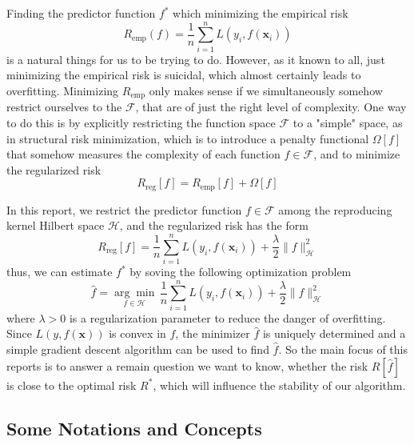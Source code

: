 Finding the predictor function $f^{*}$ which minimizing the empirical risk
\begin{equation}
	R_{\text{emp}}(f)=\frac{1}{n}\sum_{i=1}^{n}L\left(y_{i},f(\textbf{x}_{i})\right)
\end{equation}
is a natural things for us to be trying to do. However, as it known to all, just minimizing the empirical risk is suicidal, which almost certainly leads to overfitting. Minimizing $R_{\text{emp}}$ only makes sense if we simultaneously somehow restrict ourselves to the $\mathcal{F}$, that are of just the right level of complexity. One way to do this is by explicitly restricting the function space $\mathcal{F}$ to a "simple" space, as in structural risk minimization, which is to introduce a penalty functional $\Omega[f]$ that somehow measures the complexity of each function $f\in\mathcal{F}$, and to minimize the regularized risk
\begin{equation}
	R_{\text{reg}}[f]=R_{\text{emp}}[f]+\Omega[f]
\end{equation}

In this report, we restrict the predictor function $f\in\mathcal{F}$ among the reproducing kernel Hilbert space $\mathcal{H}$, and the regularized risk has the form
\begin{equation}
	\label{eq:regularized-risk-of-rkhs}
	R_{\text{reg}}[f]=\frac{1}{n}\sum_{i=1}^{n}L\left(y_{i},f(\mathbf{x}_{i})\right)+\frac{\lambda}{2}\|f\|_{\mathcal{H}}^{2}
\end{equation}
thus, we can estimate $f^{*}$ by soving the following optimization problem
\begin{equation}
	\hat{f}=\underset{f\in\mathcal{H}}{\arg\min}\,\frac{1}{n}\sum_{i=1}^{n}L\left(y_{i},f(\mathbf{x}_{i})\right)+\frac{\lambda}{2}\|f\|_{\mathcal{H}}^{2}
\end{equation}
where $\lambda>0$ is a regularization parameter to reduce the danger of overfitting. Since $L\left(y,f(\mathbf{x})\right)$ is convex in $f$, the minimizer $\hat{f}$ is uniquely determined and a simple gradient descent algorithm can be used to find $\hat{f}$. So the main focus of this reports is to answer a remain question we want to know, whether the risk $R[\hat{f}]$ is close to the optimal risk $R^{*}$, which will influence the stability of our algorithm.

\subsection{Some Notations and Concepts}

